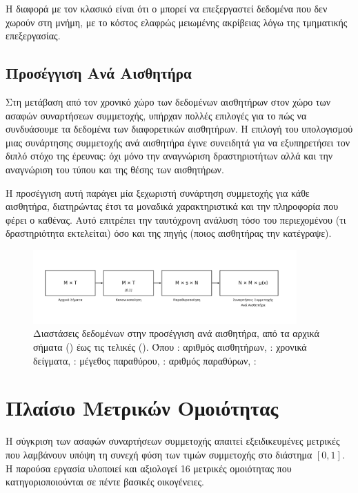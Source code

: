 Η διαφορά με τον κλασικό  είναι ότι ο  μπορεί να επεξεργαστεί δεδομένα που δεν χωρούν στη μνήμη, με το κόστος ελαφρώς μειωμένης ακρίβειας λόγω της τμηματικής επεξεργασίας.

\subsection{Προσέγγιση Ανά Αισθητήρα}

Στη μετάβαση από τον χρονικό χώρο των δεδομένων αισθητήρων στον χώρο των ασαφών συναρτήσεων συμμετοχής, υπήρχαν πολλές επιλογές για το πώς να συνδυάσουμε τα δεδομένα των διαφορετικών αισθητήρων.
Η επιλογή του υπολογισμού μιας συνάρτησης συμμετοχής ανά αισθητήρα έγινε συνειδητά για να εξυπηρετήσει τον διπλό στόχο της έρευνας: όχι μόνο την αναγνώριση δραστηριοτήτων αλλά και την αναγνώριση του τύπου και της θέσης των αισθητήρων.

Η προσέγγιση αυτή παράγει μία ξεχωριστή συνάρτηση συμμετοχής για κάθε αισθητήρα, διατηρώντας έτσι τα μοναδικά χαρακτηριστικά και την πληροφορία που φέρει ο καθένας. Αυτό επιτρέπει την ταυτόχρονη ανάλυση τόσο του περιεχομένου (τι δραστηριότητα εκτελείται) όσο και της πηγής (ποιος αισθητήρας την κατέγραψε).

\begin{figure}[ht]
    \centering
    \includegraphics[width=0.9\textwidth]{images/minimal_per_sensor_flow.png}
    \caption{Διαστάσεις δεδομένων στην προσέγγιση ανά αισθητήρα, από τα αρχικά σήματα () έως τις τελικές  (). Όπου : αριθμός αισθητήρων, : χρονικά δείγματα, : μέγεθος παραθύρου, : αριθμός παραθύρων, : }
    \label{fig:per_sensor_flow}
\end{figure}

\section{Πλαίσιο Μετρικών Ομοιότητας}

Η σύγκριση των ασαφών συναρτήσεων συμμετοχής απαιτεί εξειδικευμένες μετρικές που λαμβάνουν υπόψη τη συνεχή φύση των τιμών συμμετοχής στο διάστημα $[0,1]$. Η παρούσα εργασία υλοποιεί και αξιολογεί 16 μετρικές ομοιότητας που κατηγοριοποιούνται σε πέντε βασικές οικογένειες.

